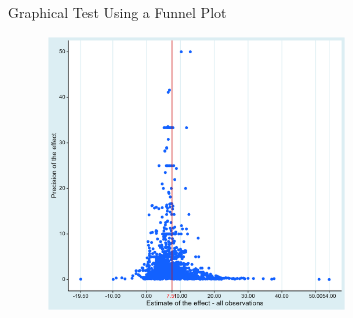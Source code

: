 \documentclass{beamer} %
\begin{document}
\begin{frame}{Graphical Test Using a Funnel Plot}
    \begin{figure}[htbp]
        \begin{center}
            \includegraphics[width=0.7\textwidth]{Figures/funnel.png}
        \end{center}
    \end{figure}
\end{frame}
\end{document}
